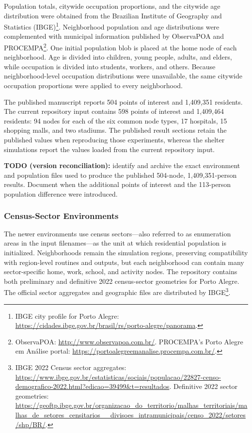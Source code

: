 Population totals, citywide occupation proportions, and the citywide age distribution were obtained from the Brazilian Institute of Geography and Statistics (IBGE)\footnote{IBGE city profile for Porto Alegre: \url{https://cidades.ibge.gov.br/brasil/rs/porto-alegre/panorama}.}. Neighborhood population and age distributions were complemented with municipal information published by ObservaPOA and PROCEMPA\footnote{ObservaPOA: \url{http://www.observapoa.com.br/}. PROCEMPA's Porto Alegre em An\'alise portal: \url{https://portoalegreemanalise.procempa.com.br/}.}. One initial population blob is placed at the home node of each neighborhood. Age is divided into children, young people, adults, and elders, while occupation is divided into students, workers, and others. Because neighborhood-level occupation distributions were unavailable, the same citywide occupation proportions were applied to every neighborhood.

The published manuscript reports 504 points of interest and 1,409,351 residents. The current repository input contains 598 points of interest and 1,409,464 residents: 94 nodes for each of the six common node types, 17 hospitals, 15 shopping malls, and two stadiums. The published result sections retain the published values when reproducing those experiments, whereas the shelter simulations report the values loaded from the current repository input.

{\color{red}\textbf{TODO (version reconciliation):} identify and archive the exact environment and population files used to produce the published 504-node, 1,409,351-person results. Document when the additional points of interest and the 113-person population difference were introduced.}

\subsubsection{Census-Sector Environments}

The newer environments use census sectors---also referred to as enumeration areas in the input filenames---as the unit at which residential population is initialized. Neighborhoods remain the simulation regions, preserving compatibility with region-level routines and outputs, but each neighborhood can contain many sector-specific home, work, school, and activity nodes. The repository contains both preliminary and definitive 2022 census-sector geometries for Porto Alegre. The official sector aggregates and geographic files are distributed by IBGE\footnote{IBGE 2022 Census sector aggregates: \url{https://www.ibge.gov.br/estatisticas/sociais/populacao/22827-censo-demografico-2022.html?edicao=39499&t=resultados}. Definitive 2022 sector geometries: \url{https://geoftp.ibge.gov.br/organizacao_do_territorio/malhas_territoriais/malhas_de_setores_censitarios__divisoes_intramunicipais/censo_2022/setores/shp/BR/}.}.


